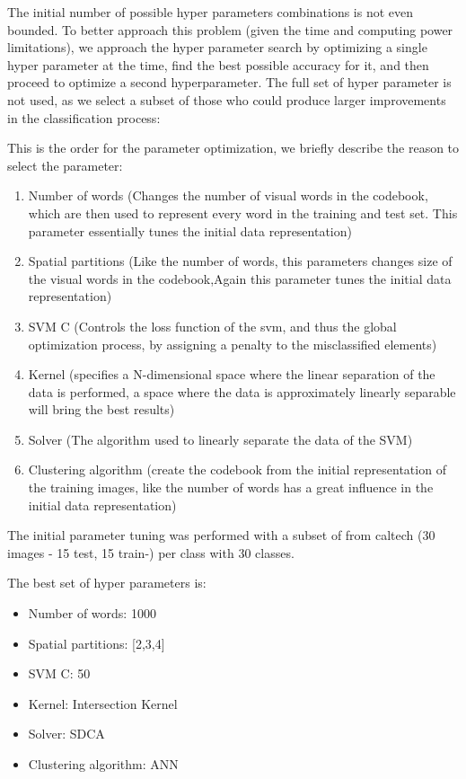 \documentclass[10pt,twocolumn,letterpaper]{article}
\begin{document}
The initial number of possible hyper parameters combinations is not even bounded. To better approach this problem (given the time and computing power limitations), we approach the hyper parameter search by optimizing a single hyper parameter at the time, find the best possible accuracy for it, and then proceed to optimize a second hyperparameter. The full set of hyper parameter is not used, as we select a subset of those who could produce larger improvements in the classification process:

This is the order for the parameter optimization, we briefly describe the reason to select the parameter:

\begin{enumerate}
	\item Number of words (Changes the number of visual words in the codebook, which are then used to represent every word
in the training and test set. This parameter essentially tunes the initial data representation)
	\item Spatial partitions (Like the number of words,  this parameters changes size of the visual words in the codebook,Again this parameter tunes the initial data  representation)
	\item SVM C (Controls the loss function of the svm, and thus the global optimization process, by assigning a penalty to the misclassified elements)
	\item Kernel (specifies a N-dimensional space where the linear separation of the data is performed, a space where the data is approximately linearly separable will bring the best results)
	\item Solver (The algorithm used to linearly separate the data of the SVM)
	\item Clustering algorithm (create the codebook from the initial representation of the training images, like the number of words has a great influence in the initial data representation)
\end{enumerate}
The initial parameter tuning was performed  with a subset of  from caltech (30 images - 15 test, 15 train-) per class with 30 classes.

The best set of hyper parameters is:
\begin{itemize}
	\item Number of words: 1000
	\item Spatial partitions: [2,3,4]
	\item SVM C: 50
	\item Kernel:  Intersection  Kernel
	\item Solver: SDCA
	\item Clustering algorithm: ANN
\end{itemize}
\end{document}
